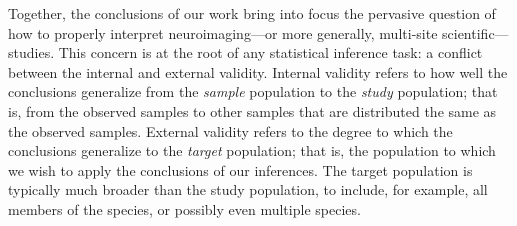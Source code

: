 Together, the conclusions of our work bring into focus the pervasive question of how to properly interpret neuroimaging---or more generally, multi-site scientific---studies.%
This concern is at the root of any statistical inference task: a conflict between the internal and external validity. Internal validity refers to how well the conclusions  generalize from the \textit{sample} population to the \textit{study} population; that is, from the observed samples to other samples that are distributed the same as the observed samples.
External validity refers to the degree to which the conclusions generalize to the \textit{target} population; that is, the population to which we wish to apply the conclusions of our inferences. The target population is typically much broader than the study population, to include, for example, all members of the species, or possibly even multiple species. 

